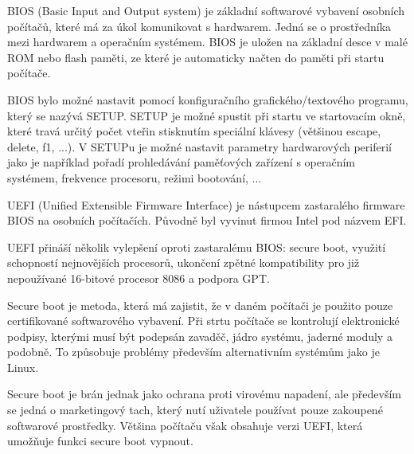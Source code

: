 

%




\Obsah





BIOS (Basic Input and Output system) je základní softwarové vybavení osobních počítačů, které má za úkol komunikovat s hardwarem. Jedná se o prostředníka mezi hardwarem a operačním systémem. BIOS je uložen na základní desce v malé ROM nebo flash paměti, ze které je automaticky načten do paměti při startu počítače. 

BIOS bylo možné nastavit pomocí konfiguračního grafického/textového programu, který se nazývá SETUP. SETUP je možné spustit při startu ve startovacím okně, které travá určitý počet vteřin stisknutím speciální klávesy (většinou escape, delete, f1, ...). V SETUPu je možné nastavit parametry hardwarových periferií jako je například pořadí prohledávání paměťových zařízení s operačním systémem, frekvence procesoru, režimi bootování, ...


UEFI (Unified Extensible Firmware Interface) je nástupcem zastaralého firmware BIOS na osobních počítačích. Původně byl vyvinut firmou Intel pod názvem EFI. 

UEFI přináší několik vylepšení oproti zastaralému BIOS: secure boot, využití schopností nejnovějších procesorů, ukončení zpětné kompatibility pro již nepoužívané 16-bitové procesor 8086 a podpora GPT.


Secure boot je metoda, která má zajistit, že v daném počítači je použito pouze certifikované softwarového vybavení. Při strtu počítače se kontrolují elektronické podpisy, kterými musí být podepsán zavaděč, jádro systému, jaderné moduly a podobně. To způsobuje problémy především alternativním systémům jako je Linux. 

Secure boot je brán jednak jako ochrana proti virovému napadení, ale  především se jedná o marketingový tach, který nutí uživatele používat pouze zakoupené softwarové prostředky. Většina počítaču však obsahuje verzi UEFI, která umožňuje funkci secure boot vypnout.

